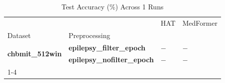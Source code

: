 \begin{table}
\caption{Test Accuracy (\%) Across 1 Runs}
\label{tab:results_acc}
\begin{tabular}{llll}
\toprule
 &  & HAT & MedFormer \\
Dataset & Preprocessing &  &  \\
\midrule
\multirow[t]{2}{*}{\textbf{chbmit_512win}} & \textbf{epilepsy_filter_epoch} & $-$ & $-$ \\
\textbf{} & \textbf{epilepsy_nofilter_epoch} & $-$ & $-$ \\
\cline{1-4}
\bottomrule
\end{tabular}
\end{table}

